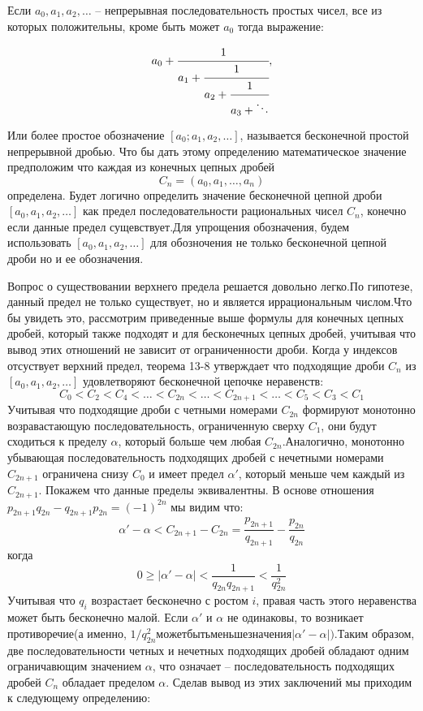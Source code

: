 \documentclass[11pt]{article}
\begin{document}
Если $a_0,a_1,a_2,\dots$ -- непрерывная последовательность простых чисел, все из которых положительны, кроме быть может $a_0$ тогда выражение: 
		
		\[a_0+\cfrac{1}{a_1+\cfrac{1}{a_2+\cfrac{1}{a_3+\ddots}}},\]
		
Или более простое обозначение $[a_0;a_1,a_2,\dots]$, называется бесконечной простой непрерывной дробью. Что бы дать этому определению математическое значение предположим что каждая из конечных цепных дробей
$$C_n=(a_0,a_1,\dots,a_n)$$
определена. Будет логично определить значение бесконечной цепной дроби $[a_0,a_1,a_2,\dots]$ как предел последовательности рациональных чисел $C_n$, конечно если данные предел сущевствует.Для упрощения обозначения, будем использовать $[a_0,a_1,a_2,\dots]$ для обозночения не только бесконечной цепной дроби но и ее обозначения.

Вопрос о существовании верхнего предела решается довольно легко.По гипотезе, данный предел не только существует, но и является иррациональным числом.Что бы увидеть это, рассмотрим приведенные выше формулы для конечных цепных дробей, который также подходят и для бесконечных цепных дробей, учитывая что вывод этих отношений не зависит от ограниченности дроби. Когда у индексов отсуствует верхний предел, теорема 13-8 утверждает что подходящие дроби $C_n$ из $[a_0,a_1,a_2,\dots]$ удовлетворяют бесконечной цепочке неравенств:
$$C_0<C_2<C_4<\dots<C_{2n}<\dots<C_{2n+1}<\dots<C_5<C_3<C_1$$
Учитывая что подходящие дроби с четными номерами $C_{2n}$ формируют монотонно возравастающую последовательность, ограниченную сверху $C_1$, они будут сходиться к пределу $\alpha$, который больше чем любая $C_{2n}$.Аналогично, монотонно убывающая последовательность подходящих дробей с нечетными номерами $C_{2n+1}$ ограничена снизу $C_0$ и имеет предел $\alpha'$, который меньше чем каждый из $C_{2n+1}$. Покажем что данные пределы эквивалентны. В основе отношения $p_{2n+1}q_{2n}-q_{2n+1}p_{2n}=(-1)^{2n}$ мы видим что:
$$\alpha'-\alpha<C_{2n+1}-C_{2n}=\frac{p_{2n+1}}{q_{2n+1}}-\frac{p_{2n}}{q_{2n}}$$
когда
$$0\ge|\alpha'-\alpha|<\frac{1}{q_{2n}q_{2n+1}}<\frac{1}{q_{2n}^2}$$
Учитывая что $q_i$ возрастает бесконечно с ростом $i$, правая часть этого неравенства может быть бесконечно малой. Если $\alpha'$ и $\alpha$ не одинаковы, то возникает противоречие(а именно, $1/q_{2n}^2 может быть меньше значения |\alpha'-\alpha|)$.Таким образом, две последовательности четных и нечетных подходящих дробей обладают одним ограничавющим значением $\alpha$, что означает -- последовательность подходящих дробей $C_n$ обладает пределом $\alpha$.
Сделав вывод из этих заключений мы приходим к следующему определению:
\end{document}
